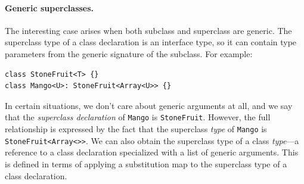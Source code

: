 \documentclass[../generics]{subfiles}
\begin{document}
\paragraph{Generic superclasses.} The interesting case arises when both subclass and superclass are generic. The superclass type of a class declaration is an interface type, so it can contain type parameters from the generic signature of the subclass. For example:
\begin{Verbatim}
class StoneFruit<T> {}
class Mango<U>: StoneFruit<Array<U>> {}
\end{Verbatim}
In certain situations, we don't care about generic arguments at all, and we say that the \emph{superclass declaration} of \texttt{Mango} is \texttt{StoneFruit}. However, the full relationship is expressed by the fact that the superclass \emph{type} of \texttt{Mango} is \texttt{StoneFruit<Array<\rT>>}.  We can also obtain the superclass type of a class \emph{type}---a reference to a class declaration specialized with a list of generic arguments. This is defined in terms of applying a substitution map to the superclass type of a class declaration.
\end{document}
